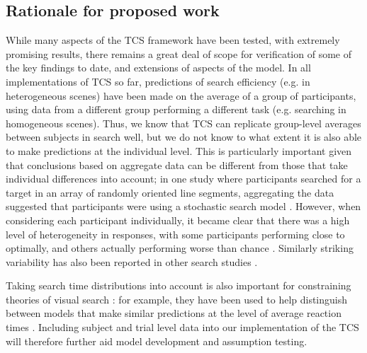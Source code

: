 \documentclass[preprint,12pt,authoryear]{elsarticle}
\begin{document}
\subsection{Rationale for proposed work}

While many aspects of the TCS framework have been tested, with extremely promising results, there remains a great deal of scope for verification of some of the key findings to date, and extensions of aspects of the model. In all implementations of TCS so far, predictions of search efficiency (e.g. in heterogeneous scenes) have been made on the average of a group of participants, using data from a different group performing a different task (e.g. searching in homogeneous scenes). Thus, we know that TCS can replicate group-level averages between subjects in search well, but we do not know to what extent it is also able to make predictions at the individual level. This is particularly important given that conclusions based on aggregate data can be different from those that take individual differences into account; in one study where participants searched for a target in an array of randomly oriented line segments, aggregating the data suggested that participants were using a stochastic search model \citep{nowakowska2017human}. However, when considering each participant individually, it became clear that there was a high level of heterogeneity in responses, with some participants performing close to optimally, and others actually performing worse than chance \citep{nowakowska2017human}. Similarly striking variability has also been reported in other search studies \citep{irons2016choosing, irons2018characterizing, clarke2020stable}. 

Taking search time distributions into account is also important for constraining theories of visual search \citep{wolfe2010reaction, liesefeld2020theoretical}: for example, they have been used to help distinguish between models that make similar predictions at the level of average reaction times \citep{moran2016serial, moran2017appeal}. Including subject and trial level data into our implementation of the TCS will therefore further aid model development and assumption testing.
\end{document}
